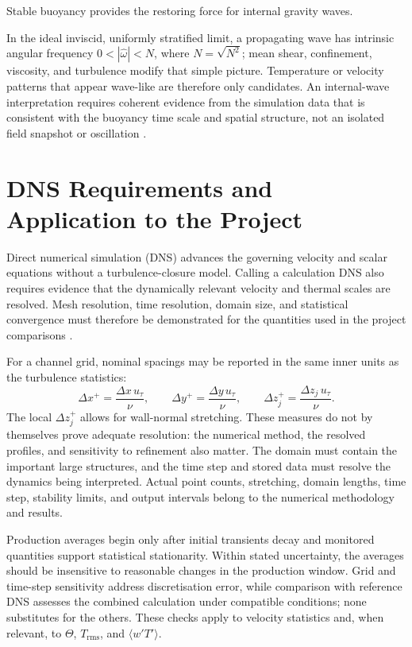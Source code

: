 Stable buoyancy provides the restoring force for internal gravity waves.

In the ideal inviscid, uniformly stratified limit, a
propagating wave has intrinsic angular frequency
$0<|\widehat{\omega}|<N$, where $N=\sqrt{N^2}$; mean shear, confinement,
viscosity, and turbulence
modify that simple picture. Temperature or velocity patterns that appear
wave-like are therefore only candidates. An internal-wave interpretation
requires coherent evidence from the simulation data that is consistent with
the buoyancy time scale and spatial structure, not an isolated field snapshot
or oscillation \cite{armenioSarkar2002}.

\section{DNS Requirements and Application to the Project}
\label{sec:dns-requirements-project-application}

Direct numerical simulation (DNS) advances the governing velocity and scalar
equations without a turbulence-closure model. Calling a calculation DNS also
requires evidence that the dynamically relevant velocity and thermal scales
are resolved. Mesh resolution, time resolution, domain size, and statistical
convergence must therefore be demonstrated for the quantities used in the
project comparisons \cite{pope2000}.

For a channel grid, nominal spacings may be reported in the same inner units as
the turbulence statistics:
\begin{equation}
  \Delta x^+=\frac{\Delta x\,u_\tau}{\nu},
  \qquad
  \Delta y^+=\frac{\Delta y\,u_\tau}{\nu},
  \qquad
  \Delta z_j^+=\frac{\Delta z_j\,u_\tau}{\nu}.
  \label{eq:dns-grid-wall-units}
\end{equation}
The local $\Delta z_j^+$ allows for wall-normal stretching. These measures do
not by themselves prove adequate resolution: the numerical method, the
resolved profiles, and sensitivity to refinement also matter. The domain must
contain the important large structures, and the time step and stored data must
resolve the dynamics being interpreted. Actual point counts, stretching,
domain lengths, time step, stability limits, and output intervals belong to
the numerical methodology and results.

Production averages begin only after initial transients decay and monitored
quantities support statistical stationarity. Within stated uncertainty, the
averages should be insensitive to reasonable changes in the production window.
Grid and time-step sensitivity address discretisation error, while comparison
with reference DNS assesses the combined calculation under compatible
conditions; none substitutes for the others. These checks apply to velocity
statistics and, when relevant, to $\Theta$, $T_{\mathrm{rms}}$, and
$\langle w'T'\rangle$.


